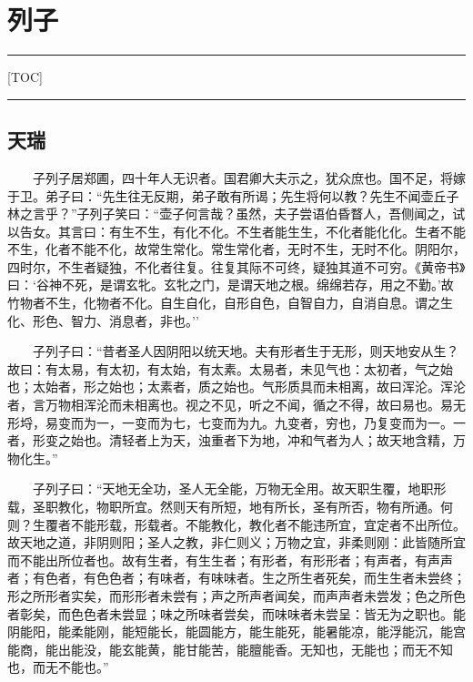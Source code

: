 \hypertarget{ux5217ux5b50}{%
\section{列子}\label{ux5217ux5b50}}

\begin{center}\rule{0.5\linewidth}{\linethickness}\end{center}

{[}TOC{]}

\begin{center}\rule{0.5\linewidth}{\linethickness}\end{center}

\hypertarget{ux5929ux745e}{%
\subsection{天瑞}\label{ux5929ux745e}}

　　子列子居郑圃，四十年人无识者。国君卿大夫示之，犹众庶也。国不足，将嫁于卫。弟子曰：``先生往无反期，弟子敢有所谒；先生将何以教？先生不闻壶丘子林之言乎？''子列子笑曰：``壶子何言哉？虽然，夫子尝语伯昏瞀人，吾侧闻之，试以告女。其言曰：有生不生，有化不化。不生者能生生，不化者能化化。生者不能不生，化者不能不化，故常生常化。常生常化者，无时不生，无时不化。阴阳尔，四时尔，不生者疑独，不化者往复。往复其际不可终，疑独其道不可穷。《黄帝书》曰：`谷神不死，是谓玄牝。玄牝之门，是谓天地之根。绵绵若存，用之不勤。'故竹物者不生，化物者不化。自生自化，自形自色，自智自力，自消自息。谓之生化、形色、智力、消息者，非也。''

　　子列子曰：``昔者圣人因阴阳以统天地。夫有形者生于无形，则天地安从生？故曰：有太易，有太初，有太始，有太素。太易者，未见气也：太初者，气之始也；太始者，形之始也；太素者，质之始也。气形质具而未相离，故曰浑沦。浑沦者，言万物相浑沦而未相离也。视之不见，听之不闻，循之不得，故曰易也。易无形埒，易变而为一，一变而为七，七变而为九。九变者，穷也，乃复变而为一。一者，形变之始也。清轻者上为天，浊重者下为地，冲和气者为人；故天地含精，万物化生。''

　　子列子曰：``天地无全功，圣人无全能，万物无全用。故天职生覆，地职形载，圣职教化，物职所宜。然则天有所短，地有所长，圣有所否，物有所通。何则？生覆者不能形载，形载者。不能教化，教化者不能违所宜，宜定者不出所位。故天地之道，非阴则阳；圣人之教，非仁则义；万物之宜，非柔则刚：此皆随所宜而不能出所位者也。故有生者，有生生者；有形者，有形形者；有声者，有声声者；有色者，有色色者；有味者，有味味者。生之所生者死矣，而生生者未尝终；形之所形者实矣，而形形者未尝有；声之所声者闻矣，而声声者未尝发；色之所色者彰矣，而色色者未尝显；味之所味者尝矣，而味味者未尝呈：皆无为之职也。能阴能阳，能柔能刚，能短能长，能圆能方，能生能死，能暑能凉，能浮能沉，能宫能商，能出能没，能玄能黄，能甘能苦，能膻能香。无知也，无能也；而无不知也，而无不能也。''

